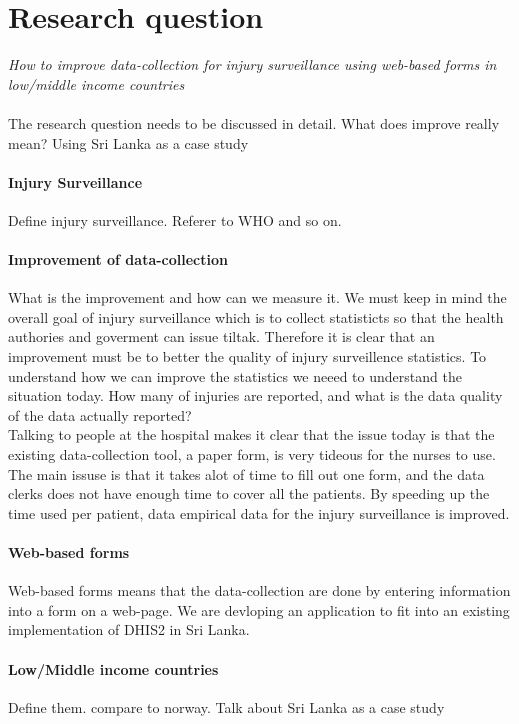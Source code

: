 \documentclass[UKenglish, 12pt]{article}
\begin{document}
\section*{Research question}
\emph{How to improve data-collection for injury surveillance using web-based forms in low/middle income countries}
\\ \\
The research question needs to be discussed in detail. What does improve really mean? Using Sri Lanka as a case study \\

\paragraph*{Injury Surveillance}
Define injury surveillance. Referer to WHO and so on.

\paragraph*{Improvement of data-collection} 
What is the improvement and how can  we measure it. We must keep in mind the overall goal of injury surveillance which is to collect statisticts so that the health authories and goverment can issue tiltak. Therefore it is clear that an improvement must be to better the quality of injury surveillence statistics. To understand how we can improve the statistics we neeed to understand the situation today. How many of injuries are reported, and what is the data quality of the data actually reported? \\
Talking to people at the hospital makes it clear that the issue today is that the existing data-collection tool, a paper form, is very tideous for the nurses to use. The main issuse is that it takes alot of time to fill out one form, and the data clerks does not have enough time to cover all the patients. By speeding up the time used per patient, data empirical data for the injury surveillance is improved.

\paragraph*{Web-based forms}
Web-based forms means that the data-collection are done by entering information into a form on a web-page. We are devloping an application to fit into an existing implementation of DHIS2 in Sri Lanka.

\paragraph*{Low/Middle income countries}
Define them. compare to norway. Talk about Sri Lanka as a case study
 
\end{document}
